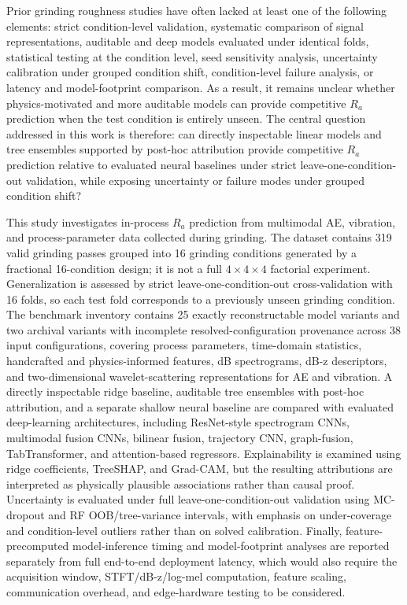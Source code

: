 Prior grinding roughness studies have often lacked at least one of the following elements: strict condition-level validation, systematic comparison of signal representations, auditable and deep models evaluated under identical folds, statistical testing at the condition level, seed sensitivity analysis, uncertainty calibration under grouped condition shift, condition-level failure analysis, or latency and model-footprint comparison. As a result, it remains unclear whether physics-motivated and more auditable models can provide competitive \(R_a\) prediction when the test condition is entirely unseen. The central question addressed in this work is therefore: can directly inspectable linear models and tree ensembles supported by post-hoc attribution provide competitive \(R_a\) prediction relative to evaluated neural baselines under strict leave-one-condition-out validation, while exposing uncertainty or failure modes under grouped condition shift?

This study investigates in-process \(R_a\) prediction from multimodal AE, vibration, and process-parameter data collected during grinding. The dataset contains 319 valid grinding passes grouped into 16 grinding conditions generated by a fractional 16-condition design; it is not a full \(4 \times 4 \times 4\) factorial experiment. Generalization is assessed by strict leave-one-condition-out cross-validation with 16 folds, so each test fold corresponds to a previously unseen grinding condition. The benchmark inventory contains 25 exactly reconstructable model variants and two archival variants with incomplete resolved-configuration provenance across 38 input configurations, covering process parameters, time-domain statistics, handcrafted and physics-informed features, dB spectrograms, dB-z descriptors, and two-dimensional wavelet-scattering representations for AE and vibration. A directly inspectable ridge baseline, auditable tree ensembles with post-hoc attribution, and a separate shallow neural baseline are compared with evaluated deep-learning architectures, including ResNet-style spectrogram CNNs, multimodal fusion CNNs, bilinear fusion, trajectory CNN, graph-fusion, TabTransformer, and attention-based regressors. Explainability is examined using ridge coefficients, TreeSHAP, and Grad-CAM, but the resulting attributions are interpreted as physically plausible associations rather than causal proof. Uncertainty is evaluated under full leave-one-condition-out validation using MC-dropout and RF OOB/tree-variance intervals, with emphasis on under-coverage and condition-level outliers rather than on solved calibration. Finally, feature-precomputed model-inference timing and model-footprint analyses are reported separately from full end-to-end deployment latency, which would also require the acquisition window, STFT/dB-z/log-mel computation, feature scaling, communication overhead, and edge-hardware testing to be considered.

